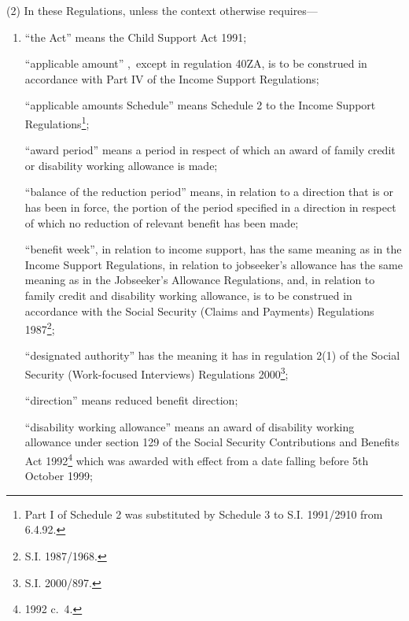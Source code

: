 \documentclass[a4paper,12pt]{article}
\begin{document}
(2) In these Regulations, unless the context otherwise requires—
\begin{enumerate}\item[]
“the Act” means the Child Support Act 1991;

“applicable amount”%
,~except in regulation 40ZA,  %
 is to be construed in accordance with Part IV of the Income Support Regulations;

“applicable amounts Schedule” means Schedule 2 to the Income Support Regulations\footnote{\frenchspacing Part I of Schedule 2 was substituted by Schedule 3 to S.I. 1991/2910 from 6.4.92.};

“award period” means a period in respect of which an award of family credit or disability working allowance is made;

“balance of the reduction period” means, in relation to a direction that is or has been in force, the portion of the period specified in a direction in respect of which no reduction of relevant benefit has been made;

“benefit week”, in relation to income support, has the same meaning as in the Income Support Regulations, 
in relation to jobseeker’s allowance has the same meaning as in the Jobseeker’s Allowance Regulations,  %
and, in relation to family credit and disability working allowance, is to be construed in accordance with the Social Security (Claims and Payments) Regulations 1987\footnote{\frenchspacing S.I. 1987/1968.};

“designated authority” has the meaning it has in regulation 2(1) of the Social Security (Work-focused Interviews) Regulations 2000\footnote{\frenchspacing S.I. 2000/897.};

“direction” means reduced benefit direction;


“disability working allowance” means an award of disability working allowance under section 129 of the Social Security Contributions and Benefits Act 1992\footnote{1992 c.\ 4.} which was awarded with effect from a date falling before 5th October 1999;


\end{enumerate}
\end{document}
